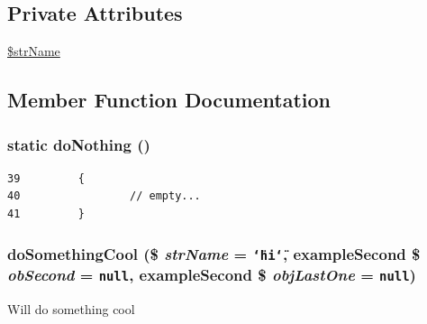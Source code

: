 \subsection*{Private Attributes}
\begin{CompactItemize}
\item 
\hyperlink{class_example_code_reflecion_90edf7538a74be8ac5ce46baaf203382}{\$strName}
\end{CompactItemize}


\subsection{Member Function Documentation}
\hypertarget{class_example_code_reflecion_82081362ac40db52076731b35d8aa5f4}{
\subsubsection[{doNothing}]{\setlength{\rightskip}{0pt plus 5cm}static doNothing ()}}
\label{class_example_code_reflecion_82081362ac40db52076731b35d8aa5f4}




\begin{Code}\begin{verbatim}39         {
40                 // empty...
41         }
\end{verbatim}
\end{Code}


\hypertarget{class_example_code_reflecion_bf19f7a457cf5f0e92ecd5f42e76018e}{
\subsubsection[{doSomethingCool}]{\setlength{\rightskip}{0pt plus 5cm}doSomethingCool (\$ {\em strName} = {\tt \char`\"{}hi\char`\"{}}, \/  {\bf exampleSecond} \$ {\em obSecond} = {\tt null}, \/  {\bf exampleSecond} \$ {\em objLastOne} = {\tt null})}}
\label{class_example_code_reflecion_bf19f7a457cf5f0e92ecd5f42e76018e}


Will do something cool

